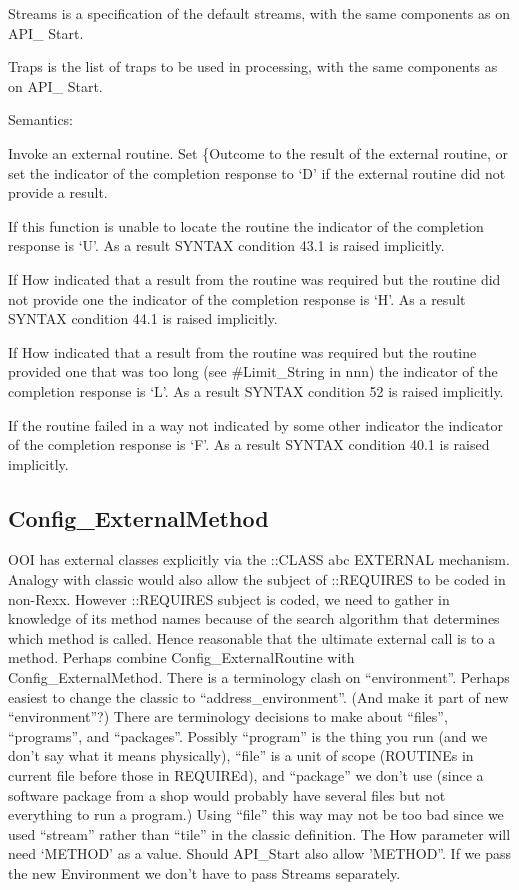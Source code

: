 Streams is a specification of the default streams, with the same
components as on API\_ Start.

Traps is the list of traps to be used in processing, with the same
components as on API\_ Start.

Semantics:

Invoke an external routine. Set \{Outcome to the result of the external
routine, or set the indicator of the completion response to `D' if the
external routine did not provide a result.

If this function is unable to locate the routine the indicator of the
completion response is `U'. As a result SYNTAX condition 43.1 is raised
implicitly.

If How indicated that a result from the routine was required but the
routine did not provide one the indicator of the completion response is
`H'. As a result SYNTAX condition 44.1 is raised implicitly.

If How indicated that a result from the routine was required but the
routine provided one that was too long (see \#Limit\_String in nnn) the
indicator of the completion response is `L'. As a result SYNTAX
condition 52 is raised implicitly.

If the routine failed in a way not indicated by some other indicator the
indicator of the completion response is `F'. As a result SYNTAX
condition 40.1 is raised implicitly.

\subsection{Config\_ExternalMethod}\label{config_externalmethod}

OOI has external classes explicitly via the ::CLASS abc EXTERNAL
mechanism. Analogy with classic would also allow the subject of
::REQUIRES to be coded in non-Rexx. However ::REQUIRES subject is coded,
we need to gather in knowledge of its method names because of the search
algorithm that determines which method is called. Hence reasonable that
the ultimate external call is to a method. Perhaps combine
Config\_ExternalRoutine with Config\_ExternalMethod. There is a
terminology clash on ``environment''. Perhaps easiest to change the
classic to ``address\_environment''. (And make it part of new
``environment''?) There are terminology decisions to make about
``files'', ``programs'', and ``packages''. Possibly ``program'' is the
thing you run (and we don't say what it means physically), ``file'' is a
unit of scope (ROUTINEs in current file before those in REQUIREd), and
``package'' we don't use (since a software package from a shop would
probably have several files but not everything to run a program.) Using
``file'' this way may not be too bad since we used ``stream'' rather
than ``tile'' in the classic definition. The How parameter will need
`METHOD' as a value. Should API\_Start also allow 'METHOD''. If we pass
the new Environment we don't have to pass Streams separately.

